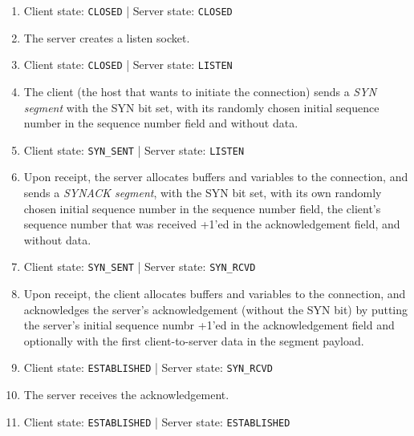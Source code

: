 \documentclass[table, xcdraw]{article}%
\begin{document}
\begin{enumerate}
    \item[\textbullet] Client state: \texttt{CLOSED} | Server state: \texttt{CLOSED}
    \item[0] The server creates a listen socket.
    \item[\textbullet] Client state: \texttt{CLOSED} | Server state: \texttt{LISTEN}
    \item The client (the host that wants to initiate the connection) sends a \emph{SYN segment} with the SYN bit set, with its randomly chosen initial sequence number in the sequence number field and without data.
    \item[\textbullet] Client state: \texttt{SYN_SENT} | Server state: \texttt{LISTEN}
    \item Upon receipt, the server allocates buffers and variables to the connection, and sends a \emph{SYNACK segment}, with the SYN bit set, with its own randomly chosen initial sequence number in the sequence number field, the client's sequence number that was received +1'ed in the acknowledgement field, and without data.
    \item[\textbullet] Client state: \texttt{SYN_SENT} | Server state: \texttt{SYN_RCVD}
    \item Upon receipt, the client allocates buffers and variables to the connection, and acknowledges the server's acknowledgement (without the SYN bit) by putting the server's initial sequence numbr +1'ed in the acknowledgement field and optionally with the first client-to-server data in the segment payload.
    \item[\textbullet] Client state: \texttt{ESTABLISHED} | Server state: \texttt{SYN_RCVD}
    \item The server receives the acknowledgement.
    \item[\textbullet] Client state: \texttt{ESTABLISHED} | Server state: \texttt{ESTABLISHED}
\end{enumerate}
\end{document}
